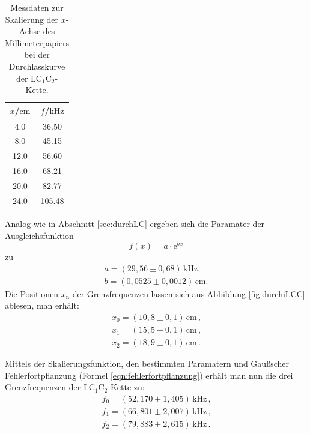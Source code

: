 \begin{table}
	\caption{Messdaten zur Skalierung der $x$-Achse des Millimeterpapiers bei der
	Durchlasskurve der LC$_1$C$_2$-Kette.}
	\label{tab:skalaLCC}
	\centering
	\begin{tabular}{cc}
		\toprule
		$x$/$\si{\centi\meter}$ & $f$/$\si{\kilo\hertz}$ \\
		\midrule
		4.0                     & 36.50                  \\
		8.0                     & 45.15                  \\
		12.0                    & 56.60                  \\
		16.0                    & 68.21                  \\
		20.0                    & 82.77                  \\
		24.0                    & 105.48                 \\
		\bottomrule
	\end{tabular}
\end{table}
Analog wie in Abschnitt \ref{sec:durchLC} ergeben sich die Paramater der Ausgleichsfunktion
\begin{equation*}
	f(x) = a \cdot \mathrm{e}^{bx}
\end{equation*}
zu
\begin{gather*}
	a = (29,56 \pm 0,68) \, \si{\kilo\hertz} \text{,} \\
	b = (0,0525 \pm 0,0012) \, \si{\centi\meter} \text{.}
\end{gather*}
Die Positionen $x_\text{n}$ der Grenzfrequenzen lassen sich aus Abbildung \ref{fig:durchiLCC}
ablesen, man erhält:
\begin{gather*}
	x_0 = (10,8 \pm 0,1) \, \si{\centi\meter} \, \text{,} \\
	x_1 = (15,5 \pm 0,1) \, \si{\centi\meter} \, \text{,} \\
	x_2 = (18,9 \pm 0,1) \, \si{\centi\meter} \, \text{.}
\end{gather*}

Mittels der Skalierungsfunktion, den bestimmten Paramatern und Gaußscher Fehlerfortpflanzung
(Formel \eqref{eqn:fehlerfortpflanzung}) erhält man nun die drei Grenzfrequenzen der
LC$_1$C$_2$-Kette zu:
\begin{gather*}
	f_0 = (52,170 \pm 1,405) \, \si{\kilo\hertz} \, \text{,} \\
	f_1 = (66,801 \pm 2,007) \, \si{\kilo\hertz} \, \text{,} \\
	f_2 = (79,883 \pm 2,615) \, \si{\kilo\hertz} \, \text{.}
\end{gather*}

